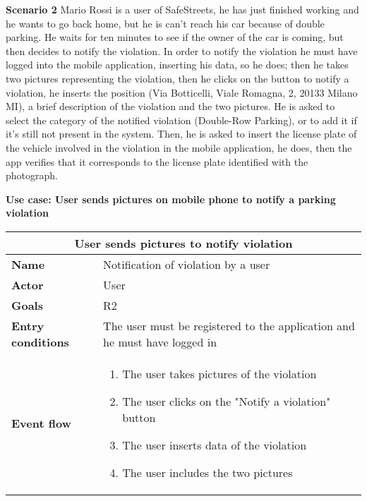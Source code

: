 \begin{description}
    \item \textbf{Scenario 2} \newline
        Mario Rossi is a user of SafeStreets, he has just finished working and he wants to go back home, but he is can't reach his car because of double parking. He waits for ten 
        minutes to see if the owner of the car is coming, but then decides to notify the violation. In order to notify the violation he must have logged into the mobile application, inserting his data, so he does; then he takes two pictures representing the violation, 
        then he clicks on the button to notify a violation, he inserts the position (Via Botticelli, Viale Romagna, 2, 20133 Milano MI), a brief description 
        of the violation and the two pictures. He is asked to select the category of the notified violation (Double-Row Parking), or to add it if it's still not present in the system.
        Then, he is asked to insert the license plate of the vehicle involved in the violation in the mobile application, he does, then the app verifies that it 
        corresponds to the license plate identified with the photograph.
    \item \textbf{Use case: User sends pictures on mobile phone to notify a parking violation}
    \begin{center}
        \begin{tabular}{|p{3cm}|p{7cm}|}
            \multicolumn{2}{c}{\textbf{User sends pictures to notify violation}} \\
            \hline
            \textbf{Name} & Notification of violation by a user \\
            \hline
            \textbf{Actor} & User \\
            \hline
            \textbf{Goals} & R2 \\
            \hline
            \textbf{Entry conditions} & The user must be registered to the application and he must have logged in \\
            \hline
            \textbf{Event flow} &
            \begin{enumerate}
                \item The user takes pictures of the violation
                \item The user clicks on the "Notify a violation" button
                \item The user inserts data of the violation
                \item The user includes the two pictures 

\end{enumerate}
\end{tabular}
\end{center}
\end{description}
